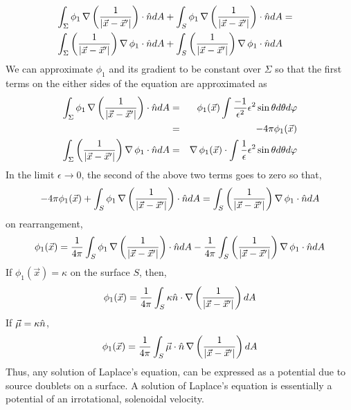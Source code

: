 \begin{enumerate}
\begin{itemize}
\begin{eqnarray*}
\int_{\Sigma}\phi_1\operatorname{\nabla}\left(\frac{1}{|\vec{x} - \vec{x}^\prime|}\right)\cdot\hat{n} dA + \int_{S}\phi_1\operatorname{\nabla}\left(\frac{1}{|\vec{x} - \vec{x}^\prime|}\right)\cdot\hat{n} dA &=& \\
\int_{\Sigma}\left(\frac{1}{|\vec{x} - \vec{x}^\prime|}\right)\operatorname{\nabla}\phi_1\cdot\hat{n} dA + \int_{S}\left(\frac{1}{|\vec{x} - \vec{x}^\prime|}\right)\operatorname{\nabla}\phi_1\cdot\hat{n} dA & &
\end{eqnarray*}
We can approximate $\phi_1$ and its gradient to be constant over $\Sigma$ so that the first terms on the either sides of the equation are approximated as
\begin{eqnarray*}
\int_{\Sigma}\phi_1\operatorname{\nabla}\left(\frac{1}{|\vec{x} - \vec{x}^\prime|}\right)\cdot\hat{n} dA&=&\phi_1(\vec{x})\int\frac{-1}{\epsilon^2}\epsilon^2\sin\theta d\theta d\varphi \\
 &=& -4\pi\phi_1(\vec{x}) \\
\int_{\Sigma}\left(\frac{1}{|\vec{x} - \vec{x}^\prime|}\right)\operatorname{\nabla}\phi_1\cdot\hat{n} dA &=& \operatorname{\nabla}\phi_1(\vec{x})\cdot\int\frac{1}{\epsilon}\epsilon^2\sin\theta d\theta d\varphi
\end{eqnarray*}
In the limit $\epsilon \rightarrow 0$, the second of the above two terms goes to zero so that,
\[
-4\pi\phi_1(\vec{x}) + \int_{S}\phi_1\operatorname{\nabla}\left(\frac{1}{|\vec{x} - \vec{x}^\prime|}\right)\cdot\hat{n} dA = \int_{S}\left(\frac{1}{|\vec{x} - \vec{x}^\prime|}\right)\operatorname{\nabla}\phi_1\cdot\hat{n} dA
\]
on rearrangement,
\[
\phi_1(\vec{x}) = \frac{1}{4\pi}\int_{S}\phi_1\operatorname{\nabla}\left(\frac{1}{|\vec{x} - \vec{x}^\prime|}\right)\cdot\hat{n} dA - 
\frac{1}{4\pi}\int_{S}\left(\frac{1}{|\vec{x} - \vec{x}^\prime|}\right)\operatorname{\nabla}\phi_1\cdot\hat{n} dA
\]
If $\phi_1(\vec{x}) = \kappa$ on the surface $S$, then,
\[
\phi_1(\vec{x}) = \frac{1}{4\pi}\int_{S}\kappa\hat{n}\cdot\operatorname{\nabla}\left(\frac{1}{|\vec{x} - \vec{x}^\prime|}\right) dA 
\]
If $\vec{\mu} = \kappa\hat{n}$,
\[
\phi_1(\vec{x}) = \frac{1}{4\pi}\int_{S}\vec{\mu}\cdot\hat{n}\operatorname{\nabla}\left(\frac{1}{|\vec{x} - \vec{x}^\prime|}\right) dA 
\]
Thus, any solution of Laplace's equation, can be expressed as a potential due to source doublets on a surface. A solution of Laplace's equation is essentially a potential of an 
irrotational, solenoidal velocity.
\end{itemize}
\end{enumerate}
